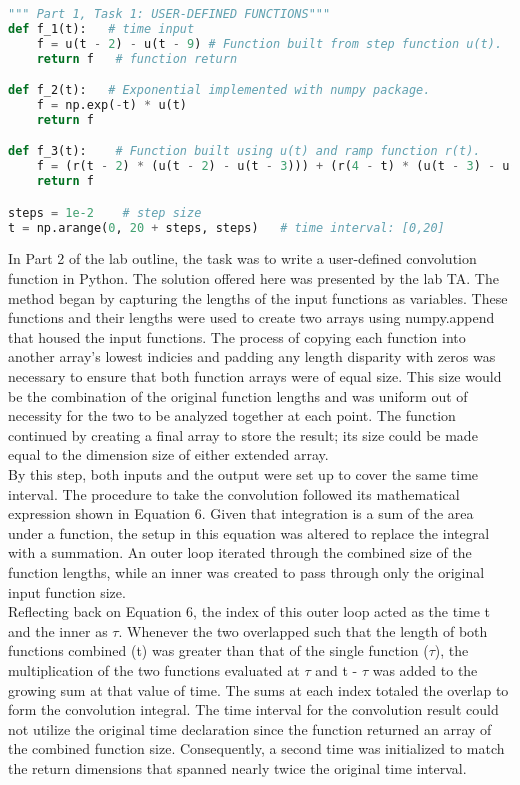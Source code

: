 \documentclass[12pt]{report}
\begin{document}
\begin{lstlisting}[language=Python]
""" Part 1, Task 1: USER-DEFINED FUNCTIONS"""
def f_1(t):   # time input
	f = u(t - 2) - u(t - 9) # Function built from step function u(t).
	return f   # function return

def f_2(t):   # Exponential implemented with numpy package.
	f = np.exp(-t) * u(t) 
	return f  

def f_3(t):    # Function built using u(t) and ramp function r(t).
	f = (r(t - 2) * (u(t - 2) - u(t - 3))) + (r(4 - t) * (u(t - 3) - u(t - 4)))
	return f 

steps = 1e-2    # step size
t = np.arange(0, 20 + steps, steps)   # time interval: [0,20]
\end{lstlisting}
	
In Part 2 of the lab outline, the task was to write a user-defined convolution function in Python. The solution offered here was presented by the lab TA. The method began by capturing the lengths of the input functions as variables. These functions and their lengths were used to create two arrays using numpy.append that housed the input functions. The process of copying each function into another array's lowest indicies and padding any length disparity with zeros was necessary to ensure that both function arrays were of equal size. This size would be the combination of the original function lengths and was uniform out of necessity for the two to be analyzed together at each point. The function continued by creating a final array to store the result; its size could be made equal to the dimension size of either extended array. \\ 

By this step, both inputs and the output were set up to cover the same time interval. The procedure to take the convolution followed its mathematical expression shown in Equation 6. Given that integration is a sum of the area under a function, the setup in this equation was altered to replace the integral with a summation. An outer loop iterated through the combined size of the function lengths, while an inner was created to pass through only the original input function size. \\

Reflecting back on Equation 6, the index of this outer loop acted as the time t and the inner as $\tau$. Whenever the two overlapped such that the length of both functions combined (t) was greater than that of the single function ($\tau$), the multiplication of the two functions evaluated at $\tau$ and t - $\tau$ was added to the growing sum at that value of time. The sums at each index totaled the overlap to form the convolution integral. The time interval for the convolution result could not utilize the original time declaration since the function returned an array of the combined function size. Consequently, a second time was initialized to match the return dimensions that spanned nearly twice the original time interval. \\
\end{document}
